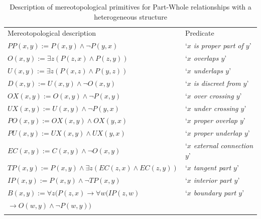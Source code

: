 \documentclass[runningheads,a4paper]{llncs}
\begin{document}
\begin{table}
\caption{Description of mereotopological primitives for Part-Whole relationships with a heterogeneous structure}
\label{tab:1}       %
\begin{tabular}{ll}
\hline\noalign{\smallskip}
Mereotopological description  & Predicate \\
\noalign{\smallskip}\hline\noalign{\smallskip}
${PP}(x,y):={P}(x,y)\wedge\neg{P}(y,x)$ & `\textit{$x$ is proper part of $y$}' \\
\noalign{\smallskip}\hline\noalign{\smallskip}
${O}(x,y):=\exists{z}({P}(z,x)\wedge{P}(z,y))$ & `\textit{$x$ overlaps $y$}' \\
\noalign{\smallskip}\hline\noalign{\smallskip}
${U}(x,y):=\exists{z}({P}(x,z)\wedge{P}(y,z))$ & `\textit{$x$ underlaps $y$}' \\
\noalign{\smallskip}\hline\noalign{\smallskip}
${D}(x,y):={U}(x,y)\wedge\neg{O}(x,y)$ & `\textit{$x$ is discreet from $y$}' \\
\noalign{\smallskip}\hline\noalign{\smallskip}
${OX}(x,y):={O}(x,y)\wedge\neg{P}(x,y)$ & `\textit{$x$ over crossing $y$}' \\
\noalign{\smallskip}\hline\noalign{\smallskip}
${UX}(x,y):={U}(x,y)\wedge\neg{P}(y,x)$ & `\textit{$x$ under crossing $y$}' \\
\noalign{\smallskip}\hline\noalign{\smallskip}
${PO}(x,y):={OX}(x,y)\wedge{OX}(y,x)$ & `\textit{$x$ proper overlap $y$}' \\
\noalign{\smallskip}\hline\noalign{\smallskip}
${PU}(x,y):={UX}(x,y)\wedge{UX}(y,x)$ & `\textit{$x$ proper underlap $y$}' \\
\noalign{\smallskip}\hline\noalign{\smallskip}
${EC}(x,y) := {C}(x,y) \wedge \neg {O}(x,y)$ & `\textit{$x$ external connection $y$}' \\
\noalign{\smallskip}\hline\noalign{\smallskip}
${TP}(x,y) := {P}(x,y) \wedge \exists z ({EC}(z,x) \wedge {EC}(z,y))$ & `\textit{$x$ tangent part $y$}' \\
\noalign{\smallskip}\hline\noalign{\smallskip}
${IP}(x,y) := {P}(x,y) \wedge \neg {TP}(x,y)$ & `\textit{$x$ interior part $y$}' \\
\noalign{\smallskip}\hline\noalign{\smallskip}
${B}(x,y):=\forall{z}({P}(z,x) \rightarrow\forall{w}({IP}(z,w)$ & `\textit{$x$ boundary part $y$}' \\
$\rightarrow{O}(w,y)\wedge\neg{P}(w,y))$ & \\
\noalign{\smallskip}\hline
\end{tabular}
\end{table}
\end{document}
